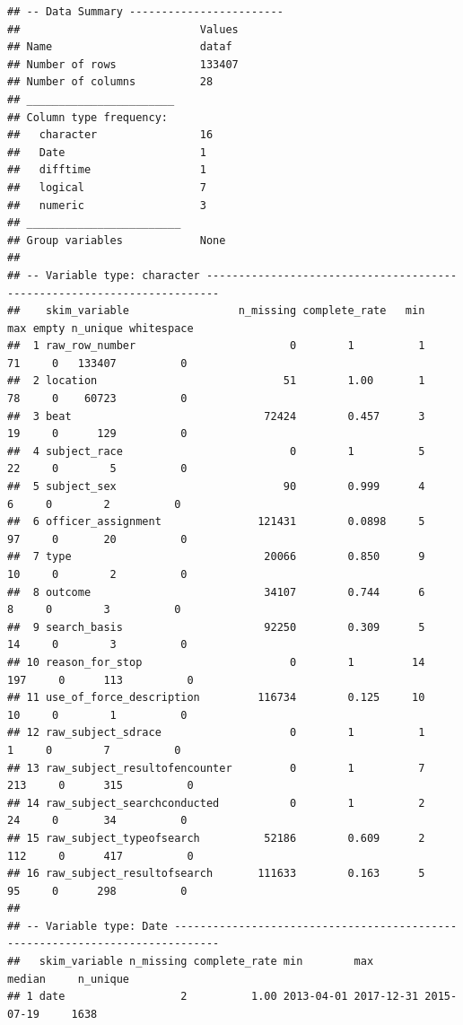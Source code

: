 \documentclass[
]{article}
\begin{document}
\begin{verbatim}
## -- Data Summary ------------------------
##                            Values
## Name                       dataf 
## Number of rows             133407
## Number of columns          28    
## _______________________          
## Column type frequency:           
##   character                16    
##   Date                     1     
##   difftime                 1     
##   logical                  7     
##   numeric                  3     
## ________________________         
## Group variables            None  
## 
## -- Variable type: character ------------------------------------------------------------------------
##    skim_variable                 n_missing complete_rate   min   max empty n_unique whitespace
##  1 raw_row_number                        0        1          1    71     0   133407          0
##  2 location                             51        1.00       1    78     0    60723          0
##  3 beat                              72424        0.457      3    19     0      129          0
##  4 subject_race                          0        1          5    22     0        5          0
##  5 subject_sex                          90        0.999      4     6     0        2          0
##  6 officer_assignment               121431        0.0898     5    97     0       20          0
##  7 type                              20066        0.850      9    10     0        2          0
##  8 outcome                           34107        0.744      6     8     0        3          0
##  9 search_basis                      92250        0.309      5    14     0        3          0
## 10 reason_for_stop                       0        1         14   197     0      113          0
## 11 use_of_force_description         116734        0.125     10    10     0        1          0
## 12 raw_subject_sdrace                    0        1          1     1     0        7          0
## 13 raw_subject_resultofencounter         0        1          7   213     0      315          0
## 14 raw_subject_searchconducted           0        1          2    24     0       34          0
## 15 raw_subject_typeofsearch          52186        0.609      2   112     0      417          0
## 16 raw_subject_resultofsearch       111633        0.163      5    95     0      298          0
## 
## -- Variable type: Date -----------------------------------------------------------------------------
##   skim_variable n_missing complete_rate min        max        median     n_unique
## 1 date                  2          1.00 2013-04-01 2017-12-31 2015-07-19     1638

\end{verbatim}
\end{document}
